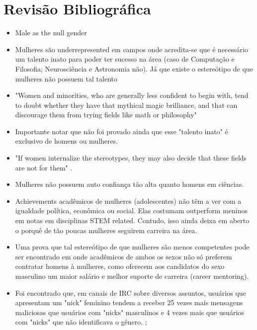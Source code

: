 \chapter{Revisão Bibliográfica}

\begin{itemize}
\item Male as the null gender\cite{fox2006women}
\end{itemize}

\begin{itemize}
	\item Mulheres são underrepresented em campos onde acredita-se que é necessário um talento inato para poder ter sucesso na área (caso de Computação e Filosofia; Neurosciência e Astronomia não)\cite{leslie2015expectations}. Já que existe o estereótipo de que mulheres não possuem tal talento\cite{tiedemann2000gender}\cite{kirkcaldy2007parental} 
	\item "Women and minorities, who are generally less confident to begin with, tend to doubt whether they have that mythical magic brilliance, and that can discourage them from trying fields like math or philosophy"\cite{leslie2015expectations}
	\item Importante notar que não foi provado ainda que esse "talento inato" é exclusivo de homens ou mulheres.\cite{hyde2005gender}
	\item "If women internalize the stereotypes, they may also decide that these fields are not for them" \cite{wigfield2000expectancy}\cite{shapiro2011major}.
	\item Mulheres não possuem auto confiança tão alta quanto homens em ciências. \cite{fox1992confidence}
	\item Achievements acadêmicos de mulheres (adolescentes) não têm a ver com a igualdade política, econômica ou social. Elas costumam outperform meninos em notas em disciplinas STEM related. Contudo, isso ainda deixa em aberto o porquê de tão poucas mulheres seguirem carreira na área. \cite{stoet2015sex}
	\item Uma prova que tal estereótipo de que mulheres são menos competentes pode ser encontrado em \cite{moss2012science} onde acadêmicos de ambos os sexos não só preferem contratar homens à mulheres, como oferecem aos candidatos do sexo masculino um maior salário e melhor suporte de carreira (career mentoring).
	\item Foi encontrado que, em canais de IRC sobre diversos assuntos, usuários que apresentam um "nick" feminino tendem a receber 25 vezes mais mensagens maliciosas que usuários com "nicks" masculinos e 4 vezes mais que usuários com "nicks" que não identificava o gênero. \cite{meyer2006assessing};

\end{itemize}
